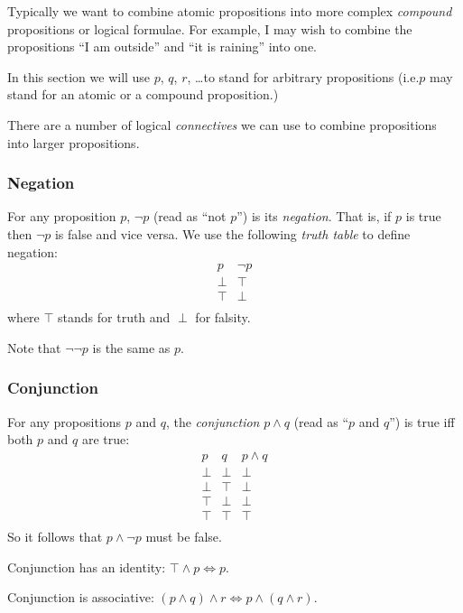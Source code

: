 \documentclass[a4paper,11pt,notitlepage,onecolumn]{article}
\makeatletter
\newcommand{\ie}%
{i.e.\@ }
\newcommand{\True}%
{\top}
\newcommand{\False}%
{\perp}
\newcommand{\Not}[1]%
{\neg{}#1}
\newcommand{\Conj}%
{\wedge}
\newcommand{\Eqv}%
{\Leftrightarrow}
\makeatother
\begin{document}
Typically we want to combine atomic propositions into more complex
\emph{compound} propositions or logical formulae.  For example, I may
wish to combine the propositions ``I am outside'' and ``it is raining''
into one.

In this section we will use $p$, $q$, $r$, \ldots to stand for arbitrary
propositions (\ie $p$ may stand for an atomic or a compound
proposition.)

There are a number of logical \emph{connectives} we can use to combine
propositions into larger propositions.

\subsubsection{Negation}

For any proposition $p$, $\Not{p}$ (read as ``not $p$'') is its
\emph{negation}.  That is, if $p$ is true then $\Not{p}$ is false and
vice versa.  We use the following \emph{truth table} to define negation:
\[
\begin{array}{c|c}
p       & \Not p \\
\hline
\False  & \True  \\
\True   & \False \\
\end{array}
\]
where $\True$ stands for truth and $\False$ for falsity.

Note that $\Not{\Not{p}}$ is the same as $p$.

\subsubsection{Conjunction}

For any propositions $p$ and $q$, the \emph{conjunction} $p \Conj q$
(read as ``$p$ and $q$'') is true iff both $p$ and $q$ are true:
\[
\begin{array}{cc|c}
p       & q       & p \Conj q \\
\hline
\False  & \False  & \False \\
\False  & \True   & \False \\
\True   & \False  & \False \\
\True   & \True   & \True \\
\end{array}
\]
So it follows that $p \Conj \Not{p}$ must be false.

Conjunction has an identity: $\True \Conj p \Eqv p$.

Conjunction is associative: $(p \Conj q) \Conj r \Eqv p \Conj (q \Conj r)$.
\end{document}
